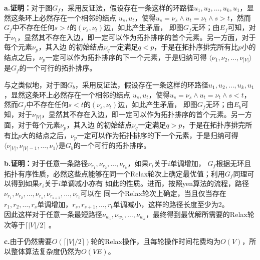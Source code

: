 \begin{solution}
    \textbf{a.证明：}对于图$G_f$，采用反证法，假设存在一条这样的环路径$u_1,u_2,\ldots,u_k,u_1$，显然这条环上必然存在一个相邻的结点
    $u_{s},u_{t}$，使得$u_{s}=\nu_s \wedge u_{t}=\nu_t\wedge s>t$，然而$G_f$中不存在任何$s>t$的$(\nu_{s},\nu_{t})$边，如此产生矛盾，
    即图$G_f$无环；由$E_f$可知，对于$\nu_1$，显然其不存在入边，即一定可以作为拓扑排序的首个元素。另一方面，对于每个元素$\nu_{p}$，其入边
    的初始结点$\nu_{q}$一定满足$q<p$，于是在拓扑序排完所有比$p$小的结点之后，$\nu_{p}$一定可以作为拓扑排序的下一个元素，于是归纳可得
    $\langle\nu_1,\nu_2,\ldots,\nu_{|V|}\rangle$ 是$G_f$的一个可行的拓扑排序。

    与之类似地，对于图$G_b$，采用反证法，假设存在一条这样的环路径$u_1,u_2,\ldots,u_k,u_1$，显然这条环上必然存在一个相邻的结点
    $u_{s},u_{t}$，使得$u_{s}=\nu_s \wedge u_{t}=\nu_t\wedge s<t$，然而$G_f$中不存在任何$s<t$的$(\nu_{s},\nu_{t})$边，如此产生矛盾，
    即图$G_f$无环；由$E_b$可知，对于$\nu_{|V|}$，显然其不存在入边，即一定可以作为拓扑排序的首个元素。另一方面，对于每个元素$\nu_{p}$，其入边
    的初始结点$\nu_{q}$一定满足$q>p$，于是在拓扑序排完所有比$p$大的结点之后，$\nu_{p}$一定可以作为拓扑排序的下一个元素，于是归纳可得
    $\langle\nu_{|V|},\nu_{|V|-1},\ldots,\nu_{1}\rangle$是$G_b$的一个可行的拓扑排序。

    \textbf{b.证明：}对于任意一条路径$\nu_{r_1},\nu_{r_2},\ldots,\nu_{r_k}$，如果$r_i$关于$i$单调增加，
    $G_f$根据无环且拓扑有序性质，必然这些点能够在同一个Relax轮次上确定最优值；利用$G_f$同理可以得到如果$r_i$关于$i$单调减小亦有
    如此的性质。进而，按照yen算法的流程，路径$\nu_{r_1},\nu_{r_2},\ldots,\nu_{r_s},\nu_{r_{s+1}},\ldots,\nu_{r_t}$可以在
    同一个Relax轮次上确定，当且仅当存在$r_1,r_2,\ldots,r_s$单调增加，$r_s,r_{s+1},\ldots,r_t$单调减小，这样的路径长度至少为2。\\
    因此这样对于任意一条最短路径$\nu_{w_1},\nu_{w_2},\ldots,\nu_{w_k}$，最终得到最优解所需要的Relax轮次等于$\lceil|V|/2\rceil$ 。

    \textbf{c.}由于仍然需要$O(\lceil|V|/2\rceil)$轮的Relax操作，且每轮操作时间花费均为$O(V)$，所以整体算法复杂度仍然为$O(VE)$。
\end{solution} 